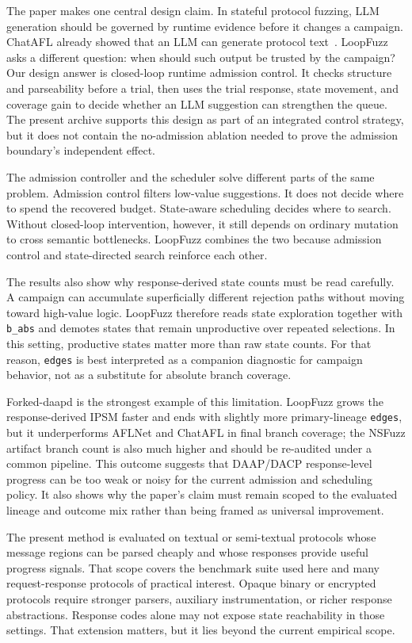 \documentclass[final,5p,times,number]{elsarticle}
\begin{document}
The paper makes one central design claim. In stateful protocol fuzzing, LLM generation should be governed by runtime evidence before it changes a campaign. ChatAFL already showed that an LLM can generate protocol text~\cite{chatafl}. LoopFuzz asks a different question: when should such output be trusted by the campaign? Our design answer is closed-loop runtime admission control. It checks structure and parseability before a trial, then uses the trial response, state movement, and coverage gain to decide whether an LLM suggestion can strengthen the queue. The present archive supports this design as part of an integrated control strategy, but it does not contain the no-admission ablation needed to prove the admission boundary's independent effect.

The admission controller and the scheduler solve different parts of the same problem. Admission control filters low-value suggestions. It does not decide where to spend the recovered budget. State-aware scheduling decides where to search. Without closed-loop intervention, however, it still depends on ordinary mutation to cross semantic bottlenecks. LoopFuzz combines the two because admission control and state-directed search reinforce each other.

The results also show why response-derived state counts must be read carefully. A campaign can accumulate superficially different rejection paths without moving toward high-value logic. LoopFuzz therefore reads state exploration together with \texttt{b\_abs} and demotes states that remain unproductive over repeated selections. In this setting, productive states matter more than raw state counts. For that reason, \texttt{edges} is best interpreted as a companion diagnostic for campaign behavior, not as a substitute for absolute branch coverage.

Forked-daapd is the strongest example of this limitation. LoopFuzz grows the response-derived IPSM faster and ends with slightly more primary-lineage \texttt{edges}, but it underperforms AFLNet and ChatAFL in final branch coverage; the NSFuzz artifact branch count is also much higher and should be re-audited under a common pipeline. This outcome suggests that DAAP/DACP response-level progress can be too weak or noisy for the current admission and scheduling policy. It also shows why the paper's claim must remain scoped to the evaluated lineage and outcome mix rather than being framed as universal improvement.

The present method is evaluated on textual or semi-textual protocols whose message regions can be parsed cheaply and whose responses provide useful progress signals. That scope covers the benchmark suite used here and many request-response protocols of practical interest. Opaque binary or encrypted protocols require stronger parsers, auxiliary instrumentation, or richer response abstractions. Response codes alone may not expose state reachability in those settings. That extension matters, but it lies beyond the current empirical scope.
\end{document}
